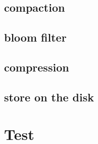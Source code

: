 \documentclass[a4paper]{article}
\begin{document}
\subsection{compaction}
\subsection{bloom filter}
\subsection{compression}
\subsection{store on the disk}

\section{Test}
\end{document}
